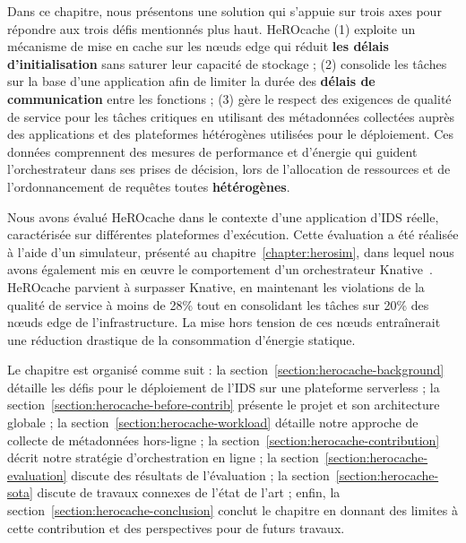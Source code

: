 Dans ce chapitre, nous présentons une solution qui s'appuie sur trois axes pour répondre aux trois défis mentionnés plus haut. HeROcache (1) exploite un mécanisme de mise en cache sur les nœuds edge qui réduit \textbf{les délais d'initialisation} sans saturer leur capacité de stockage ; (2) consolide les tâches sur la base d'une application afin de limiter la durée des \textbf{délais de communication} entre les fonctions ; (3) gère le respect des exigences de qualité de service pour les tâches critiques en utilisant des métadonnées collectées auprès des applications et des plateformes hétérogènes utilisées pour le déploiement. Ces données comprennent des mesures de performance et d'énergie qui guident l'orchestrateur dans ses prises de décision, lors de l'allocation de ressources et de l'ordonnancement de requêtes toutes \textbf{hétérogènes}.

Nous avons évalué HeROcache dans le contexte d'une application d'IDS réelle, caractérisée sur différentes plateformes d'exécution. Cette évaluation a été réalisée à l'aide d'un simulateur, présenté au chapitre~\ref{chapter:herosim}, dans lequel nous avons également mis en œuvre le comportement d'un orchestrateur Knative~\cite{knative}. HeROcache parvient à surpasser Knative, en maintenant les violations de la qualité de service à moins de 28\% tout en consolidant les tâches sur 20\% des nœuds edge de l'infrastructure. La mise hors tension de ces nœuds entraînerait une réduction drastique de la consommation d'énergie statique.

Le chapitre est organisé comme suit : la section~\ref{section:herocache-background} détaille les défis pour le déploiement de l'IDS sur une plateforme serverless ; la section~\ref{section:herocache-before-contrib} présente le projet et son architecture globale ; la section~\ref{section:herocache-workload} détaille notre approche de collecte de métadonnées hors-ligne ; la section~\ref{section:herocache-contribution} décrit notre stratégie d'orchestration en ligne ; la section~\ref{section:herocache-evaluation} discute des résultats de l'évaluation ; la section~\ref{section:herocache-sota} discute de travaux connexes de l'état de l'art ; enfin, la section~\ref{section:herocache-conclusion} conclut le chapitre en donnant des limites à cette contribution et des perspectives pour de futurs travaux.

